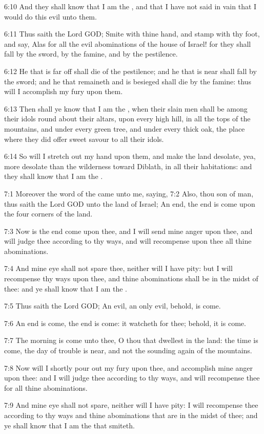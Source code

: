 6:10 And they shall know that I am the \LORD, and that I have not said
in vain that I would do this evil unto them.

6:11 Thus saith the Lord GOD; Smite with thine hand, and stamp with
thy foot, and say, Alas for all the evil abominations of the house of
Israel! for they shall fall by the sword, by the famine, and by the
pestilence.

6:12 He that is far off shall die of the pestilence; and he that is
near shall fall by the sword; and he that remaineth and is besieged
shall die by the famine: thus will I accomplish my fury upon them.

6:13 Then shall ye know that I am the \LORD, when their slain men shall
be among their idols round about their altars, upon every high hill,
in all the tops of the mountains, and under every green tree, and
under every thick oak, the place where they did offer sweet savour to
all their idols.

6:14 So will I stretch out my hand upon them, and make the land
desolate, yea, more desolate than the wilderness toward Diblath, in
all their habitations: and they shall know that I am the \LORD.

7:1 Moreover the word of the \LORD came unto me, saying, 7:2 Also, thou
son of man, thus saith the Lord GOD unto the land of Israel; An end,
the end is come upon the four corners of the land.

7:3 Now is the end come upon thee, and I will send mine anger upon
thee, and will judge thee according to thy ways, and will recompense
upon thee all thine abominations.

7:4 And mine eye shall not spare thee, neither will I have pity: but I
will recompense thy ways upon thee, and thine abominations shall be in
the midst of thee: and ye shall know that I am the \LORD.

7:5 Thus saith the Lord GOD; An evil, an only evil, behold, is come.

7:6 An end is come, the end is come: it watcheth for thee; behold, it
is come.

7:7 The morning is come unto thee, O thou that dwellest in the land:
the time is come, the day of trouble is near, and not the sounding
again of the mountains.

7:8 Now will I shortly pour out my fury upon thee, and accomplish mine
anger upon thee: and I will judge thee according to thy ways, and will
recompense thee for all thine abominations.

7:9 And mine eye shall not spare, neither will I have pity: I will
recompense thee according to thy ways and thine abominations that are
in the midst of thee; and ye shall know that I am the \LORD that
smiteth.

